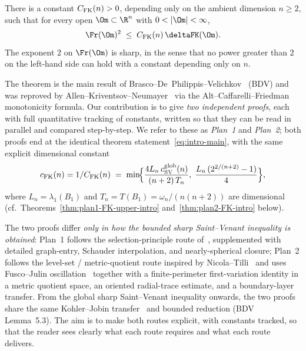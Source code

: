 \begin{theorem*}
There is a constant $C_{\rm FK}(n)>0$, depending only on the
ambient dimension $n\ge 2$, such that for every open
$\Om\subset\R^n$ with $0<|\Om|<\infty$,
\begin{equation}\label{eq:intro-main}
   \Fr(\Om)^2\;\le\;C_{\rm FK}(n)\,\deltaFK(\Om).
\end{equation}
The exponent $2$ on $\Fr(\Om)$ is sharp, in the sense that no power
greater than $2$ on the left-hand side can hold with a constant
depending only on $n$.
\end{theorem*}

The theorem is the main result of
Brasco--De~Philippis--Velichkov~\cite{BDV} (BDV) and was reproved by
Allen--Kriventsov--Neumayer~\cite{AKN2023} via the Alt--Caffarelli--Friedman
monotonicity formula. Our contribution is to give \emph{two independent
proofs}, each with full quantitative tracking of constants, written so
that they can be read in parallel and compared step-by-step. We refer
to these as \emph{Plan~1} and \emph{Plan~2}; both proofs end at the
identical theorem statement~\eqref{eq:intro-main}, with the same
explicit dimensional constant
\begin{equation}\label{eq:intro-cFKdef}
   c_{\rm FK}(n)=1/C_{\rm FK}(n)
   \;=\;\min\!\Bigl\{
      \frac{4 L_n\,c_{\rm SV}^{\rm glob}(n)}{(n+2)\,T_n},\;
      \frac{L_n\,(2^{2/(n+2)}-1)}{4}
   \Bigr\},
\end{equation}
where $L_n=\lambda_1(B_1)$ and $T_n=T(B_1)=\omega_n/(n(n+2))$ are
dimensional (cf.\ Theorems~\ref{thm:plan1-FK-upper-intro}
and~\ref{thm:plan2-FK-intro} below).

The two proofs differ \emph{only in how the bounded sharp Saint--Venant
inequality is obtained}: Plan~1 follows the selection-principle route
of~\cite{BDV}, supplemented with detailed graph-entry, Schauder
interpolation, and nearly-spherical closure; Plan~2 follows the
level-set / metric-quotient route inspired by
Nicola--Tilli~\cite{NicolaTilli2022,GGRT2024} and uses Fusco--Julin
oscillation~\cite{FJ2014} together with a finite-perimeter first-variation
identity in a metric quotient space, an oriented radial-trace estimate,
and a boundary-layer transfer. From the global sharp Saint--Venant
inequality onwards, the two proofs share the same Kohler--Jobin
transfer~\cite{KohlerJobin1978,Brasco2014} and bounded reduction (BDV
Lemma~5.3). The aim is to make both routes explicit, with constants
tracked, so that the reader sees clearly what each route requires and
what each route delivers.

